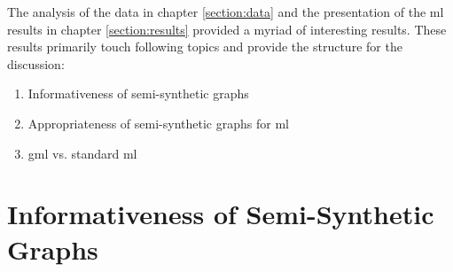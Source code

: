 
  The analysis of the data in chapter \ref{section:data} and the presentation
  of the \acs{ml} results in chapter \ref{section:results} provided a
  myriad of interesting results. These results primarily touch following topics
  and provide the structure for the discussion:

  \begin{enumerate}
      \item Informativeness of semi-synthetic graphs
      \item Appropriateness of semi-synthetic graphs for \acs{ml}
      \item \acs{gml} vs. standard \acs{ml}
  \end{enumerate}

  \section[Informativeness of Graphs]{Informativeness of Semi-Synthetic Graphs}
  \label{section:informativeness}

